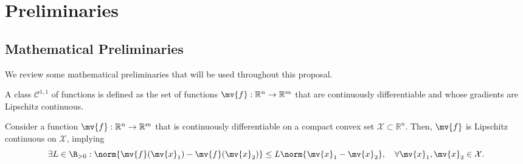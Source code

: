 \chapter{Preliminaries}
\label{chap:pre}

% 

\section{Mathematical Preliminaries}

We review some mathematical preliminaries that will be used throughout this proposal.

\begin{definition}
  \label{PRE:def:C11}
  A class $\mathcal{C}^{1,1}$ of functions is defined as the set of functions $\mv{f}:\mathbb{R}^n\to\mathbb{R}^m$ that are continuously differentiable and whose gradients are Lipschitz continuous.
\end{definition}

\begin{lem}
  \label{PRE:lem:con:lip}
  Consider a function $\mv{f}:\mathbb{R}^n\to\mathbb{R}^m$ that is continuously differentiable on a compact convex set $\mathcal{X}\subset\mathbb{R}^n$. 
  Then, $\mv{f}$ is Lipschitz continuous on $\mathcal{X}$, implying
  \begin{equation}
    \exists
    L\in\R_{>0}
    :
    \norm{\mv{f}(\mv{x}_1)-\mv{f}(\mv{x}_2)}\le L\norm{\mv{x}_1-\mv{x}_2}
    ,
    \quad\forall \mv{x}_1,\mv{x}_2\in\mathcal{X}
    .
  \end{equation}
\end{lem}

